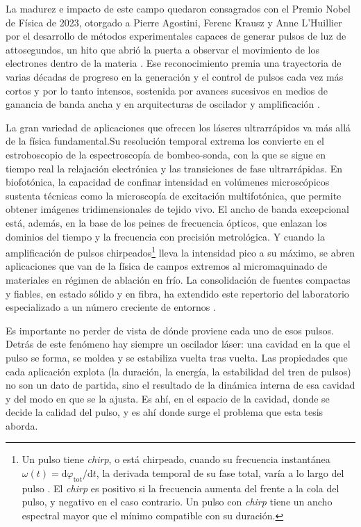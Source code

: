 La madurez e impacto de este campo quedaron consagrados con el Premio Nobel de Física de 2023, otorgado a Pierre Agostini, Ferenc Krausz y Anne L'Huillier por el desarrollo de métodos experimentales capaces de generar pulsos de luz de attosegundos, un hito que abrió la puerta a observar el movimiento de los electrones dentro de la materia \cite{Nobel2023}. Ese reconocimiento premia una trayectoria de varias décadas de progreso en la generación y el control de pulsos cada vez más cortos y por lo tanto intensos, sostenida por avances sucesivos en medios de ganancia de banda ancha y en arquitecturas de oscilador y amplificación \cite{Krausz1992,Keller2022}.

La gran variedad de aplicaciones que ofrecen los láseres ultrarrápidos va más allá de la física fundamental.Su resolución temporal extrema los convierte en el estroboscopio de la espectroscopía de bombeo-sonda, con la que se sigue en tiempo real la relajación electrónica y las transiciones de fase ultrarrápidas. En biofotónica, la capacidad de confinar intensidad en volúmenes microscópicos sustenta técnicas como la microscopía de excitación multifotónica, que permite obtener imágenes tridimensionales de tejido vivo. El ancho de banda excepcional está, además, en la base de los peines de frecuencia ópticos, que enlazan los dominios del tiempo y la frecuencia con precisión metrológica. Y cuando la amplificación de pulsos chirpeados\footnote{%
Un pulso tiene \emph{chirp}, o está chirpeado, cuando su frecuencia instantánea
$\omega(t)=\mathrm{d}\varphi_{\mathrm{tot}}/\mathrm{d}t$, la derivada temporal de su fase total,
varía a lo largo del pulso \cite[sec.~2.4]{Keller2022}. El \emph{chirp} es positivo si la
frecuencia aumenta del frente a la cola del pulso, y negativo en el caso contrario. Un
pulso con \emph{chirp} tiene un ancho espectral mayor que el mínimo compatible con su
duración.} \cite{StricklandMourou1985} lleva la intensidad pico a su máximo, se abren aplicaciones que van de la física de campos extremos al micromaquinado de materiales en régimen de ablación en frío. La consolidación de fuentes compactas y fiables, en estado sólido y en fibra, ha extendido este repertorio del laboratorio especializado a un número creciente de entornos \cite{FermannHartl2013}.
 
Es importante no perder de vista de dónde proviene cada uno de esos pulsos. Detrás de este fenómeno hay siempre un oscilador láser: una cavidad en la que el pulso se forma, se moldea y se estabiliza vuelta tras vuelta. Las propiedades que cada aplicación explota (la duración, la energía, la estabilidad del tren de pulsos) no son un dato de partida, sino el resultado de la dinámica interna de esa cavidad y del modo en que se la ajusta. Es ahí, en el espacio de la cavidad, donde se decide la calidad del pulso, y es ahí donde surge el problema que esta tesis aborda.


